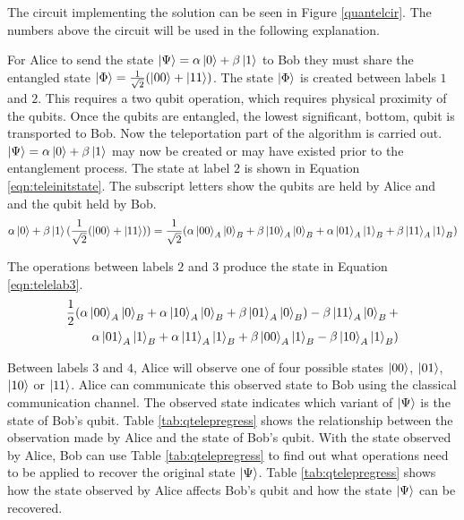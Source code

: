 The circuit implementing the solution can be seen in Figure \ref{quantelcir}.
The numbers above the circuit will be used in the following explanation.

For Alice to send the state $\left\vert{\Psi}\right\rangle=\alpha\left\vert{0}\right\rangle+\beta\left\vert{1}\right\rangle$ to Bob they must share the entangled state $\left\vert{\Phi}\right\rangle=\frac{1}{\sqrt{2}}(\left\vert{00}\right\rangle+\left\vert{11}\right\rangle)$.
The state $\left\vert{\Phi}\right\rangle$ is created between labels $1$ and $2$.
This requires a two qubit operation, which requires physical proximity of the qubits.
Once the qubits are entangled, the lowest significant, bottom, qubit is transported to Bob.
Now the teleportation part of the algorithm is carried out.
$\left\vert{\Psi}\right\rangle=\alpha\left\vert{0}\right\rangle+\beta\left\vert{1}\right\rangle$ may now be created or may have existed prior to the entanglement process.
The state at label $2$ is shown in Equation \ref{eqn:teleinitstate}.
The subscript letters show the qubits are held by Alice and and the qubit held by Bob.
\begin{equation}
 \alpha\left\vert{0}\right\rangle+\beta\left\vert{1}\right\rangle(\frac{1}{\sqrt{2}}(\left\vert{00}\right\rangle+\left\vert{11}\right\rangle)) = \frac{1}{\sqrt{2}}(\alpha\left\vert{00}\right\rangle_A\left\vert{0}\right\rangle_B+\beta\left\vert{10}\right\rangle_A\left\vert{0}\right\rangle_B+\alpha\left\vert{01}\right\rangle_A\left\vert{1}\right\rangle_B+\beta\left\vert{11}\right\rangle_A\left\vert{1}\right\rangle_B)
 \label{eqn:teleinitstate}
\end{equation}

The operations between labels $2$ and $3$ produce the state in Equation \ref{eqn:telelab3}.
\begin{eqnarray}
 \label{eqn:telelab3}
 \frac{1}{2}(
\alpha\left\vert{00}\right\rangle_A\left\vert{0}\right\rangle_B+
\alpha\left\vert{10}\right\rangle_A\left\vert{0}\right\rangle_B+
\beta\left\vert{01}\right\rangle_A\left\vert{0}\right\rangle_B)-
\beta\left\vert{11}\right\rangle_A\left\vert{0}\right\rangle_B+\\
\alpha\left\vert{01}\right\rangle_A\left\vert{1}\right\rangle_B+
\alpha\left\vert{11}\right\rangle_A\left\vert{1}\right\rangle_B+
\beta\left\vert{00}\right\rangle_A\left\vert{1}\right\rangle_B-
\beta\left\vert{10}\right\rangle_A\left\vert{1}\right\rangle_B)\nonumber
\end{eqnarray}

Between labels $3$ and $4$, Alice will observe one of four possible states $\left\vert{00}\right\rangle$, $\left\vert{01}\right\rangle$, $\left\vert{10}\right\rangle$ or $\left\vert{11}\right\rangle$.
Alice can communicate this observed state to Bob using the classical communication channel.
The observed state indicates which variant of $\left\vert{\Psi}\right\rangle$ is the state of Bob's qubit.
Table \ref{tab:qtelepregress} shows the relationship between the observation made by Alice and the state of Bob's qubit.
With the state observed by Alice, Bob can use Table \ref{tab:qtelepregress} to find out what operations need to be applied to recover the original state $\left\vert{\Psi}\right\rangle$.
Table \ref{tab:qtelepregress} shows how the state observed by Alice affects Bob's qubit and how the state $\left\vert{\Psi}\right\rangle$ can be recovered.

